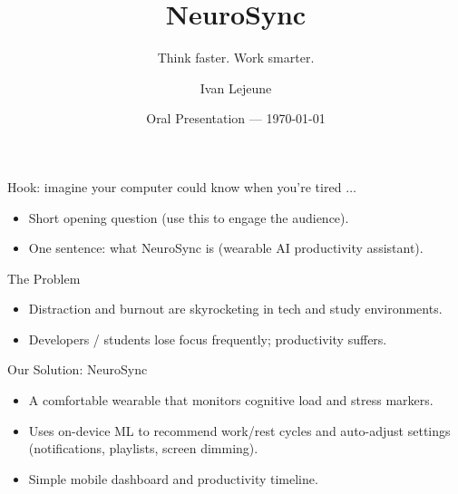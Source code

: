 \documentclass[10pt]{beamer}
\title{NeuroSync}
\subtitle{Think faster. Work smarter.}
\author{Ivan Lejeune}
\date{Oral Presentation — \today}
\begin{document}
\begin{frame}
    \titlepage
\end{frame}

\begin{frame}{Hook: imagine your computer could know when you're tired \(\ldots\)}
    \begin{itemize}
        \item Short opening question (use this to engage the audience).
        \item One sentence: what NeuroSync is (wearable AI productivity assistant).
    \end{itemize}
\end{frame}

\begin{frame}{The Problem}
    \begin{itemize}
        \item Distraction and burnout are skyrocketing in tech and study environments.
        \item Developers / students lose focus frequently; productivity suffers.
    \end{itemize}
    \vspace{0.4cm}
\end{frame}

\begin{frame}{Our Solution: NeuroSync}
    \begin{itemize}
        \item A comfortable wearable that monitors cognitive load and stress markers.
        \item Uses on-device ML to recommend work/rest cycles and auto-adjust settings (notifications, playlists, screen dimming).
        \item Simple mobile dashboard and productivity timeline.
    \end{itemize}
\end{frame}
\end{document}
